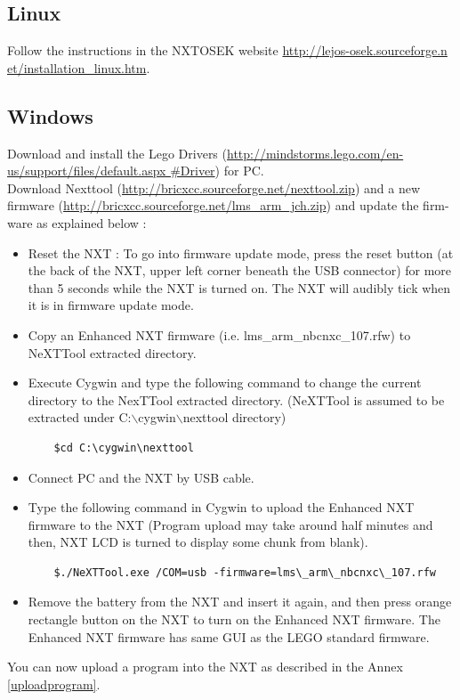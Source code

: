 \subsection{Linux}
Follow the instructions in the NXTOSEK website \href{http://lejos-osek.sourceforge.net/installation_linux.htm}{http://lejos-osek.sourceforge.n et/installation\_linux.htm}.

\subsection{Windows}
Download and install the Lego Drivers (\href{http://mindstorms.lego.com/en-us/support/files/default.aspx#Driver}{http://mindstorms.lego.com/en-us/support/files/default.aspx
\#Driver}) for PC. \\
Download Nexttool (\href{http://bricxcc.sourceforge.net/nexttool.zip}{http://bricxcc.sourceforge.net/nexttool.zip}) and a new firmware (\href{http://bricxcc.sourceforge.net/lms_arm_jch.zip}{http://bricxcc.sourceforge.net/lms\_arm\_jch.zip}) and update the firm-ware as explained below :
\begin{itemize}
\item Reset the NXT : To go into firmware update mode, press the reset button (at the back of the NXT, upper left corner beneath the USB connector) for more than 5 seconds while the NXT is turned on. The NXT will audibly tick when it is in firmware update mode.
\item Copy an Enhanced NXT firmware (i.e. lms\_arm\_nbcnxc\_107.rfw) to NeXTTool extracted directory.
\item Execute Cygwin and type the following command to change the current directory to the NexTTool extracted directory. (NeXTTool is assumed to be extracted under C:$\backslash$cygwin$\backslash$nexttool directory)
	\begin{verbatim}
	$cd C:\cygwin\nexttool
	\end{verbatim}
\item Connect PC and the NXT by USB cable.
\item Type the following command in Cygwin to upload the Enhanced NXT firmware to the NXT (Program upload may take around half minutes and then, NXT LCD is turned to display some chunk from blank).
	\begin{verbatim}
	$./NeXTTool.exe /COM=usb -firmware=lms\_arm\_nbcnxc\_107.rfw
	\end{verbatim}
\item Remove the battery from the NXT and insert it again, and then press orange rectangle button on the NXT to turn on the Enhanced NXT firmware. The Enhanced NXT firmware has same GUI as the LEGO standard firmware.
\end{itemize}
You can now upload a program into the NXT as described in the Annex \ref{uploadprogram}.

